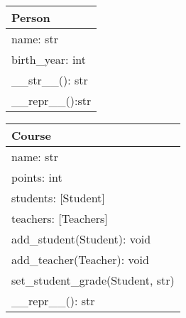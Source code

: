 \documentclass[aspectratio=169]{beamer}
\begin{document}
\begin{frame}[fragile]
	
	
	\begin{multicols}{2}
		\begin{tabular}{|l|}
			\hline
			Person \\ \hline
			name: str\\
			birth\_year: int \\ \hline
			\_\_str\_\_(): str\\
			\_\_repr\_\_():str\\ \hline
		\end{tabular}
		
		\begin{tabular}{|l|}
			\hline
			Course\\ \hline
			name: str\\
			points: int\\
			students: [Student]\\
			teachers: [Teachers]\\ \hline
			add\_student(Student): void\\
			add\_teacher(Teacher): void\\
			set\_student\_grade(Student, str)\\
			\_\_repr\_\_(): str\\ \hline
		\end{tabular}
		
	\end{multicols}
	
\end{frame}
\end{document}
